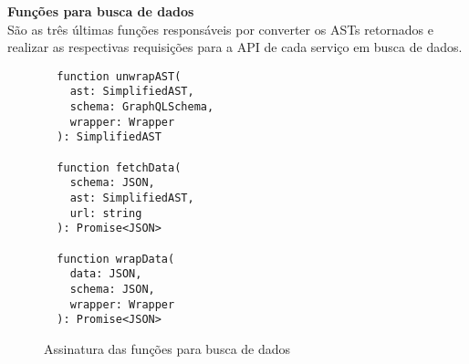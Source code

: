\textbf{Funções para busca de dados} \\

São as três últimas funções responsáveis por converter os ASTs retornados e realizar as respectivas requisições para a API de cada serviço em busca de dados.

\begin{figure}[H]
  \centering
  \begin{verbatim}
  function unwrapAST(
    ast: SimplifiedAST, 
    schema: GraphQLSchema, 
    wrapper: Wrapper
  ): SimplifiedAST

  function fetchData(
    schema: JSON, 
    ast: SimplifiedAST, 
    url: string
  ): Promise<JSON>

  function wrapData(
    data: JSON, 
    schema: JSON, 
    wrapper: Wrapper
  ): Promise<JSON>
  \end{verbatim}
  \caption{Assinatura das funções para busca de dados}
\end{figure}
